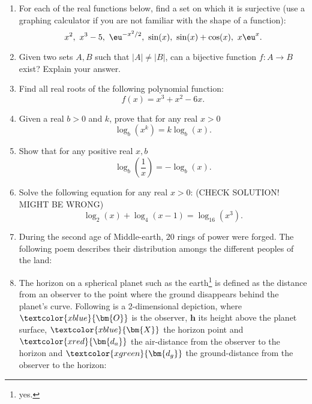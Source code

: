 \begin{enumerate}
	\item For each of the real functions below, find a set on which it is surjective (use a graphing calculator if you are not familiar with the shape of a function):
		\[
			x^{2},\ x^{3}-5,\ \eu^{-x^{2}/2},\ \sin(x),\ \sin(x)+\cos(x),\ x\eu^{x}.
		\]

	\item Given two sets $A,B$ such that $|A|\neq|B|$, can a bijective function $f:A\to B$ exist? Explain your answer.

	\item Find all real roots of the following polynomial function:
		\[
			f(x) = x^{3} + x^{2} - 6x.
		\]

	\item Given a real $b>0$ and $k$, prove that for any real $x>0$
		\[
			\log_{b} \left( x^{k} \right) = k\log_{b} \left( x \right).
		\]

	\item Show that for any positive real $x,b$
		\[
			\log_{b} \left( \frac{1}{x} \right) = -\log_{b}(x).
		\]

	\item Solve the following equation for any real $x>0$: (CHECK SOLUTION! MIGHT BE WRONG)
		\[
			\log_{2}(x) + \log_{4}(x-1) = \log_{16}\left(x^{3}\right).
		\]

	\item During the second age of Middle-earth, $20$ rings of power were forged. The following poem describes their distribution amongs the different peoples of the land:


	\item The horizon on a spherical planet such as the earth\footnote{yes.} is defined as the distance from an observer to the point where the ground disappears behind the planet's curve. Following is a 2-dimensional depiction, where $\textcolor{xblue}{\bm{O}}$ is the observer, $\bm{h}$ its height above the planet surface, $\textcolor{xblue}{\bm{X}}$ the horizon point and $\textcolor{xred}{\bm{d_{a}}}$ the air-distance from the observer to the horizon and $\textcolor{xgreen}{\bm{d_{g}}}$ the ground-distance from the observer to the horizon:


\end{enumerate}
